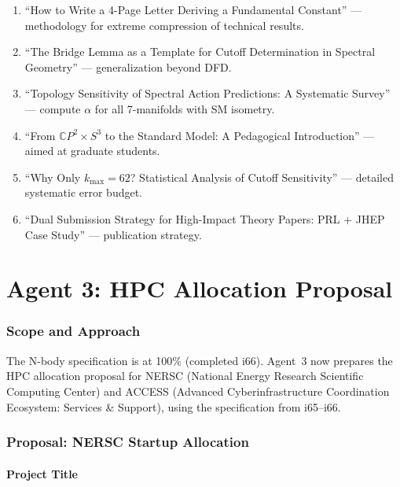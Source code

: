 \documentclass[11pt,a4paper]{article}
\newcommand{\CP}{\mathbb{C}P}
\begin{document}
\begin{enumerate}
\item ``How to Write a 4-Page Letter Deriving a Fundamental Constant'' --- methodology for extreme compression of technical results.
\item ``The Bridge Lemma as a Template for Cutoff Determination in Spectral Geometry'' --- generalization beyond DFD.
\item ``Topology Sensitivity of Spectral Action Predictions: A Systematic Survey'' --- compute $\alpha$ for all 7-manifolds with SM isometry.
\item ``From $\CP^2 \times S^3$ to the Standard Model: A Pedagogical Introduction'' --- aimed at graduate students.
\item ``Why Only $k_{\max} = 62$? Statistical Analysis of Cutoff Sensitivity'' --- detailed systematic error budget.
\item ``Dual Submission Strategy for High-Impact Theory Papers: PRL + JHEP Case Study'' --- publication strategy.
\end{enumerate}


\part{Agent 3: HPC Allocation Proposal}
\label{part:hpc-proposal}

\section{Scope and Approach}

The N-body specification is at 100\% (completed i66). Agent~3 now prepares the HPC allocation proposal for NERSC (National Energy Research Scientific Computing Center) and ACCESS (Advanced Cyberinfrastructure Coordination Ecosystem: Services \& Support), using the specification from i65--i66.

\section{Proposal: NERSC Startup Allocation}

\subsection{Project Title}
\end{document}
